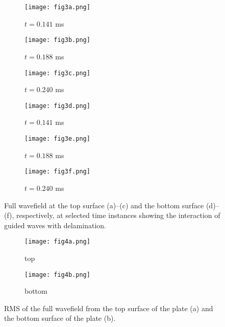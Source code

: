 \begin{figure} [h!]
	\centering
	\begin{subfigure}[b]{0.32\textwidth}
		\centering
		\texttt{[image: fig3a.png]}
		\caption{\(t=0.141\) ms}
		\label{fig:frame96top}
	\end{subfigure}
	\hfill
	\begin{subfigure}[b]{0.32\textwidth}
		\centering
		\texttt{[image: fig3b.png]}
		\caption{\(t=0.188\) ms}
		\label{fig:frame128top}
	\end{subfigure}
	\hfill
	\begin{subfigure}[b]{0.32\textwidth}
		\centering
		\texttt{[image: fig3c.png]}
		\caption{\(t=0.240\) ms}
		\label{fig:frame164top}
	\end{subfigure}	
	\hfill
	\begin{subfigure}[b]{0.32\textwidth}
		\centering
		\texttt{[image: fig3d.png]}
		\caption{\(t=0.141\) ms}
		\label{fig:frame96bottom}
	\end{subfigure}
	\hfill
	\begin{subfigure}[b]{0.32\textwidth}
		\centering
		\texttt{[image: fig3e.png]}
		\caption{\(t=0.188\) ms}
		\label{fig:frame128bottom}
	\end{subfigure}
	\hfill
	\begin{subfigure}[b]{0.32\textwidth}
		\centering
		\texttt{[image: fig3f.png]}
		\caption{\(t=0.240\) ms}
		\label{fig:frame164bottom}
	\end{subfigure}

	\caption{Full wavefield at the top surface (a)--(c) and the bottom surface (d)--(f), respectively, at selected time instances showing the interaction of guided waves with delamination.}
	\label{fig:wavefield}
\end{figure} 

\begin{figure} [h!]
	\centering
	\begin{subfigure}[b]{0.47\textwidth}
		\centering
		\texttt{[image: fig4a.png]}
		\caption{top}
		\label{fig:rmstop}
	\end{subfigure}
	\hfill
	\begin{subfigure}[b]{0.47\textwidth}
		\centering
		\texttt{[image: fig4b.png]}
		\caption{bottom}
		\label{fig:rmsbottom}
	\end{subfigure}
	\caption{RMS of the full wavefield from the top surface of the plate (a) and the bottom surface of the plate (b).}
\label{fig:rms}
\end{figure} 
